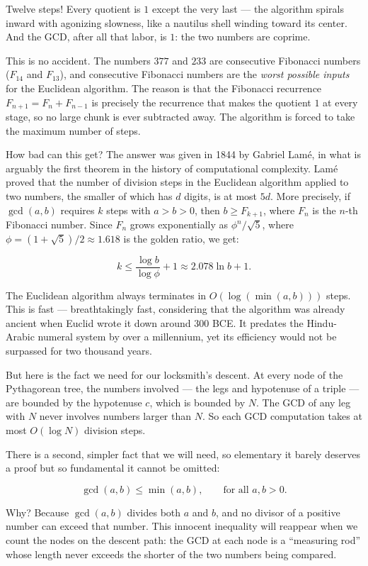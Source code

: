 Twelve steps! Every quotient is \(1\) except the very last --- the algorithm spirals inward with agonizing slowness, like a nautilus shell winding toward its center. And the GCD, after all that labor, is \(1\): the two numbers are coprime.

This is no accident. The numbers \(377\) and \(233\) are consecutive Fibonacci numbers (\(F_{14}\) and \(F_{13}\)), and consecutive Fibonacci numbers are the \emph{worst possible inputs} for the Euclidean algorithm. The reason is that the Fibonacci recurrence \(F_{n+1} = F_n + F_{n-1}\) is precisely the recurrence that makes the quotient \(1\) at every stage, so no large chunk is ever subtracted away. The algorithm is forced to take the maximum number of steps.

How bad can this get? The answer was given in 1844 by Gabriel Lamé, in what is arguably the first theorem in the history of computational complexity. Lamé proved that the number of division steps in the Euclidean algorithm applied to two numbers, the smaller of which has \(d\) digits, is at most \(5d\). More precisely, if \(\gcd(a, b)\) requires \(k\) steps with \(a > b > 0\), then \(b \ge F_{k+1}\), where \(F_n\) is the \(n\)-th Fibonacci number. Since \(F_n\) grows exponentially as \(\phi^n / \sqrt{5}\), where \(\phi = (1 + \sqrt{5})/2 \approx 1.618\) is the golden ratio, we get:

\[k \le \frac{\log b}{\log \phi} + 1 \approx 2.078 \ln b + 1.\]

The Euclidean algorithm always terminates in \(O(\log(\min(a, b)))\) steps. This is fast --- breathtakingly fast, considering that the algorithm was already ancient when Euclid wrote it down around 300 BCE. It predates the Hindu-Arabic numeral system by over a millennium, yet its efficiency would not be surpassed for two thousand years.

But here is the fact we need for our locksmith's descent. At every node of the Pythagorean tree, the numbers involved --- the legs and hypotenuse of a triple --- are bounded by the hypotenuse \(c\), which is bounded by \(N\). The GCD of any leg with \(N\) never involves numbers larger than \(N\). So each GCD computation takes at most \(O(\log N)\) division steps.

There is a second, simpler fact that we will need, so elementary it barely deserves a proof but so fundamental it cannot be omitted:

\[\gcd(a, b) \le \min(a, b), \qquad \text{for all } a, b > 0.\]

Why? Because \(\gcd(a, b)\) divides both \(a\) and \(b\), and no divisor of a positive number can exceed that number. This innocent inequality will reappear when we count the nodes on the descent path: the GCD at each node is a ``measuring rod'' whose length never exceeds the shorter of the two numbers being compared.


